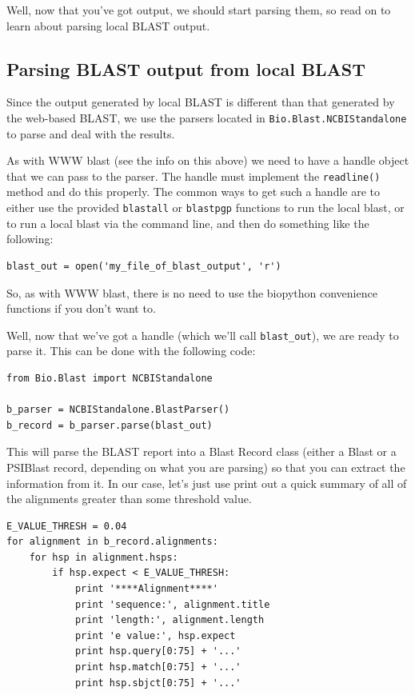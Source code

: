 \documentclass{report}
\begin{document}
Well, now that you've got output, we should start parsing them, so read on to learn about parsing local BLAST output.

\subsection{Parsing BLAST output from local BLAST}

Since the output generated by local BLAST is different than that generated by the web-based BLAST, we use the parsers located in \verb|Bio.Blast.NCBIStandalone| to parse and deal with the results.


As with WWW blast (see the info on this above) we need to have a handle object that we can pass to the parser. The handle must implement the \verb|readline()| method and do this properly. The common ways to get such a handle are to either use the provided \verb|blastall| or \verb|blastpgp| functions to run the local blast, or to run a local blast via the command line, and then do something like the following:

\begin{verbatim}
blast_out = open('my_file_of_blast_output', 'r')
\end{verbatim}

So, as with WWW blast, there is no need to use the biopython convenience functions if you don't want to.


Well, now that we've got a handle (which we'll call \verb|blast_out|), we are ready to parse it. This can be done with the following code:

\begin{verbatim}
from Bio.Blast import NCBIStandalone

b_parser = NCBIStandalone.BlastParser()
b_record = b_parser.parse(blast_out)
\end{verbatim} 

This will parse the BLAST report into a Blast Record class (either a Blast or a PSIBlast record, depending on what you are parsing) so that you can extract the information from it. In our case, let's just use print out a quick summary of all of the alignments greater than some threshold value.

\begin{verbatim}
E_VALUE_THRESH = 0.04
for alignment in b_record.alignments:
    for hsp in alignment.hsps:
        if hsp.expect < E_VALUE_THRESH:
            print '****Alignment****'
            print 'sequence:', alignment.title
            print 'length:', alignment.length
            print 'e value:', hsp.expect
            print hsp.query[0:75] + '...'
            print hsp.match[0:75] + '...'
            print hsp.sbjct[0:75] + '...'
\end{verbatim}
\end{document}
